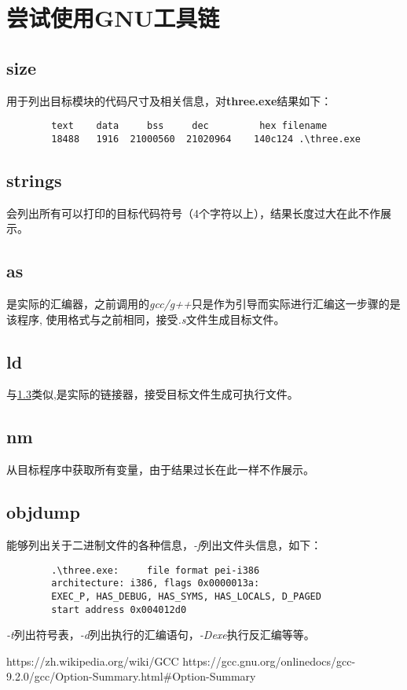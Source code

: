 \documentclass[UTF8]{ctexart}
\begin{document}
    \section{尝试使用GNU工具链}
    \subsection{size}
    用于列出目标模块的代码尺寸及相关信息，对\textbf{three.exe}结果如下：
    \begin{verbatim}
        text    data     bss     dec         hex filename
        18488   1916  21000560  21020964    140c124 .\three.exe
    \end{verbatim}
    \subsection{strings}
    会列出所有可以打印的目标代码符号（4个字符以上），结果长度过大在此不作展示。
    \subsection{as}\label{as}
    是实际的汇编器，之前调用的\emph{gcc/g++}只是作为引导而实际进行汇编这一步骤的是该程序,
    使用格式与之前相同，接受\emph{.s}文件生成目标文件。
    \subsection{ld}
    与\ref{as}类似,是实际的链接器，接受目标文件生成可执行文件。
    \subsection{nm}
    从目标程序中获取所有变量，由于结果过长在此一样不作展示。
    \subsection{objdump}
    能够列出关于二进制文件的各种信息，\emph{-f}列出文件头信息，如下：
    \begin{verbatim}
        .\three.exe:     file format pei-i386
        architecture: i386, flags 0x0000013a:
        EXEC_P, HAS_DEBUG, HAS_SYMS, HAS_LOCALS, D_PAGED
        start address 0x004012d0
    \end{verbatim}
    \emph{-t}列出符号表，\emph{-d}列出执行的汇编语句，\emph{-Dexe}执行反汇编等等。
    \begin{thebibliography}{99}
         https://zh.wikipedia.org/wiki/GCC
         https://gcc.gnu.org/onlinedocs/gcc-9.2.0/gcc/Option-Summary.html\#Option-Summary
    \end{thebibliography}
    \appendix
\end{document}
